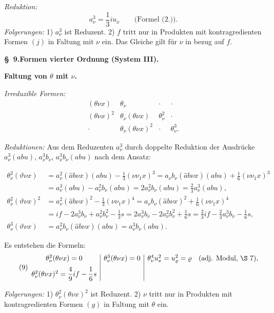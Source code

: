 \documentclass[11pt]{article}
\begin{document}
\noindent\emph{Reduktion:}
\[
a_\nu^3=\frac13 i u_x\qquad\text{(Formel (2.)).}
\]
\noindent\emph{Folgerungen:} 1) $a_\nu^3$ ist Reduzent. 2) $f$ tritt nur in Produkten mit kontragredienten Formen $(j)$ in Faltung mit $\nu$ ein. Das Gleiche gilt für $\nu$ in bezug auf $f$.

\begin{center}
\textbf{\S\ 9.\quad Formen vierter Ordnung (System III).}
\end{center}

\noindent\textbf{Faltung von $\theta$ mit $\nu$.}

\noindent\emph{Irreduzible Formen:}
\[
\begin{array}{cccc}
(\theta\nu x)&\theta_\nu&\cdot&\cdot\\
(\theta\nu x)^2&\theta_\nu(\theta\nu x)&\theta_\nu^2&\cdot\\
\cdot&\theta_\nu(\theta\nu x)^2&\cdot&\theta_\nu^3.
\end{array}
\]

\noindent\emph{Reduktionen:} Aus dem Reduzenten $a_\nu^3$ durch doppelte Reduktion der Ausdrücke $a_\nu^3(abu)$, $a_\nu^3b_\nu$, $a_\nu^3b_\nu(abu)$ nach dem Ansatz:


\[
\begin{aligned}
\theta_\nu^2(\vartheta\nu x)
&=a_\nu^2(\widehat{a}b\nu x)(abu)-\frac13(\nu\nu_1x)^3=a_\nu b_\nu(\widehat{a}b\nu x)(abu)+\frac16(\nu\nu_1x)^3\\
&=a_\nu^3(abu)-a_\nu^2b_\nu(abu)=2a_\nu^2b_\nu(abu)=\frac23a_\nu^3(abu),\\[.4em]
\theta_\nu^2(\vartheta\nu x)^2
&=a_\nu^2(\widehat{a}b\nu x)^2-\frac13(\nu\nu_1x)^4=a_\nu b_\nu(\widehat{a}b\nu x)^2+\frac16(\nu\nu_1x)^4\\
&=if-2a_\nu^3b_\nu+a_\nu^2b_\nu^2-\frac13s=2a_\nu^3b_\nu-2a_\nu^2b_\nu^2+\frac16s=\frac23if-\frac23a_\nu^3b_\nu-\frac16s,\\[.4em]
\theta_\nu^3(\vartheta\nu x)&=a_\nu^2b_\nu(\widehat{a}b\nu x)(abu)=a_\nu^3b_\nu(abu).
\end{aligned}
\]


Es entstehen die Formeln:
\[
\tag{9}
\begin{array}{c|c|c}
\theta_\nu^2(\theta\nu x)=0
& \theta_\nu^3(\theta\nu x)=0
& \theta_\nu^4u_x^2=u_\varrho^2=\varrho\quad(\text{adj. Modul, \S\ 7}),\\[0.6em]
\theta_\nu^2(\theta\nu x)^2=\dfrac49 i f-\dfrac16s
& &
\end{array}
\]

\noindent\emph{Folgerungen:} 1) $\theta_\nu^2(\theta\nu x)^2$ ist Reduzent. 2) $\nu$ tritt nur in Produkten mit kontragredienten Formen $(g)$ in Faltung mit $\theta$ ein.
\end{document}
